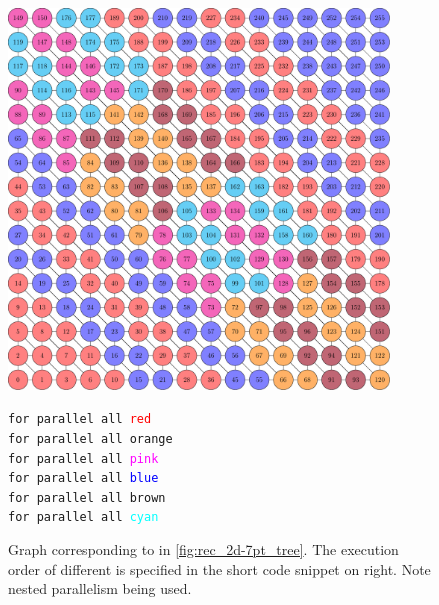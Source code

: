     \begin{figure}[H]
    	\begin{minipage}[c]{0.62\textwidth}
    		\includegraphics[height=0.25\textheight,width=0.9\textwidth]{pics/recursion/2d-7pt_example/2d-7pt/stencil_2d_7pt}
    	\end{minipage}\hfill
    	\begin{minipage}[c]{0.38\textwidth}
	    	{\tt for parallel all \textcolor{red}{red}\\
	    	\hspace*{1em} for parallel all \textcolor{amber}{orange}\\
	    	\hspace*{1em} for parallel all \textcolor{magenta}{pink}\\
	    	}
		    {\tt for parallel all \textcolor{blue}{blue}\\
	    	\hspace*{1em} for parallel all \textcolor{carmine}{brown}\\
	    	\hspace*{1em} for parallel all \textcolor{cyan}{cyan}\\
		    }
		    \caption{Graph corresponding to \levelTree in \cref{fig:rec_2d-7pt_tree}. The execution order of different \levelGroup is specified in the short code snippet on right. Note nested parallelism being used.}
		    \label{fig:rec_2d-7pt_graph}
    	\end{minipage}
    \end{figure}
 
